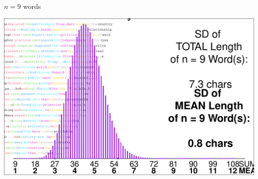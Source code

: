 \documentclass[10pt,handout]{beamer}\usepackage[]{graphicx}\usepackage[]{color}
\makeatletter
\def\maxwidth{ %
  \ifdim\Gin@nat@width>\linewidth
    \linewidth
  \else
    \Gin@nat@width
  \fi
}
\newenvironment{knitrout}{}{} %
\makeatother
\begin{document}
\begin{frame}[fragile]{$n = 9$ words}
\begin{knitrout}\tiny
{}\color{fgcolor}

{\centering \includegraphics[width=\maxwidth]{figure/unnamed-chunk-14-1} 

}


\end{knitrout}
\end{frame}
\end{document}
